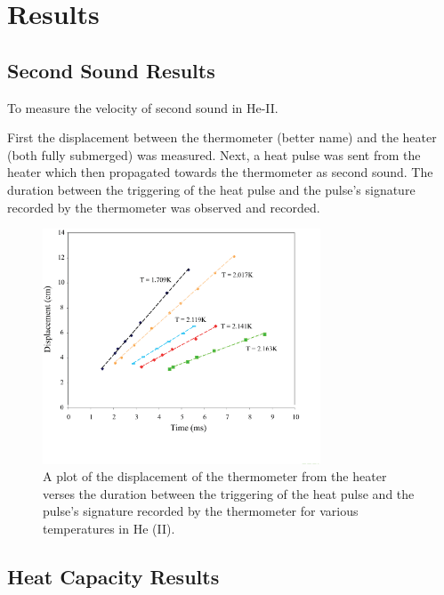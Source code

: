 
\section{Results}
\label{results}

\subsection{Second Sound Results}
\label{secondsoundresults}

To measure the velocity of second sound in He-II.  

First the displacement between the thermometer (better name) and the heater (both fully submerged) was measured. Next, a heat pulse was sent from the heater which then propagated towards the thermometer as second sound.  The duration between the triggering of the heat pulse and the pulse's signature recorded by the thermometer was observed and recorded.


\begin{figure}[htbp]
\begin{center}
\includegraphics[height=70mm]{./figures/secondsoundraw.eps}
\caption{\small{A plot of the displacement of the thermometer from the heater verses the duration between the triggering of the heat pulse and the pulse's signature recorded by the thermometer for various temperatures in He (II).}}
\label{fig:secondsoundraw}
\end{center}
\end{figure}


\subsection{Heat Capacity Results}\label{heatcapacityresults}

